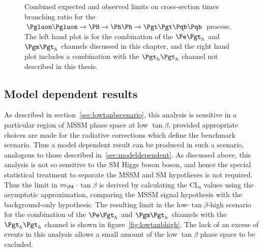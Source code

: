 \begin{figure}
\begin{center}

\end{center}
\caption[Combined expected and observed limits on cross-section times branching ratio for the
$\Pgluon\Pgluon\to\PH\to\Ph\Ph\to\Pgt\Pgt\Pqb\Pqb$ process.]{
Combined expected and observed limits on cross-section times branching ratio for the
$\Pgluon\Pgluon\to\PH\to\Ph\Ph\to\Pgt\Pgt\Pqb\Pqb$ process. The left hand plot is for the
combination of the $\etau$ and $\mutau$ channels discussed in this chapter, and
the right hand plot includes a combination with the $\tautau$ channel not
described in this thesis.}
\label{fig:HhhCmblimits}
\end{figure}

\subsection{Model dependent results}

As described in section~\ref{sec:lowtanbscenario}, this analysis is sensitive in
a particular region of \ac{MSSM} phase space at low $\tan\beta$, provided
appropriate choices are made for the radiative corrections which define the
benchmark scenario. Thus a model dependent result can be produced in such a
scenario, analogous to those described in~\ref{sec:modeldependent}. As discussed
above, this analysis is not so sensitive to the \ac{SM} Higgs boson boson, and hence
the special statistical treatment to separate the \ac{MSSM} and \ac{SM}
hypotheses is not required. Thus the limit in $m_{\PA}$--$\tan\beta$ is derived
by calculating the $\mathrm{CL_{s}}$ values using the asymptotic approximation, comparing
the \ac{MSSM} signal hypothesis with the background-only hypothesis. The
resulting limit in the low-$\tan\beta$-high scenario for the combination of the
$\etau$ and $\mutau$ channels with the $\tautau$ channel is shown in
figure~\ref{fig:lowtanbhigh}. The lack of an excess of events in this analysis
allows a small amount of the low $\tan\beta$ phase space to be excluded.

